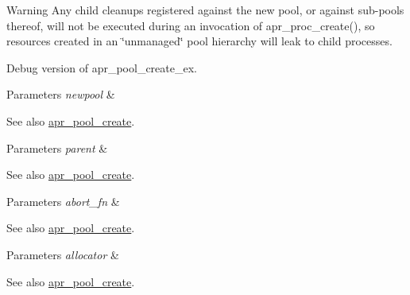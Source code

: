\begin{DoxyWarning}{Warning}
Any child cleanups registered against the new pool, or against sub-\/pools thereof, will not be executed during an invocation of apr\+\_\+proc\+\_\+create(), so resources created in an \char`\"{}unmanaged\char`\"{} pool hierarchy will leak to child processes.
\end{DoxyWarning}
Debug version of apr\+\_\+pool\+\_\+create\+\_\+ex. 
\begin{DoxyParams}{Parameters}
{\em newpool} & \\
\hline
\end{DoxyParams}
\begin{DoxySeeAlso}{See also}
\hyperlink{group__apr__pools_gaa7c40921aae156b665e82b0a66991a39}{apr\+\_\+pool\+\_\+create}. 
\end{DoxySeeAlso}

\begin{DoxyParams}{Parameters}
{\em parent} & \\
\hline
\end{DoxyParams}
\begin{DoxySeeAlso}{See also}
\hyperlink{group__apr__pools_gaa7c40921aae156b665e82b0a66991a39}{apr\+\_\+pool\+\_\+create}. 
\end{DoxySeeAlso}

\begin{DoxyParams}{Parameters}
{\em abort\+\_\+fn} & \\
\hline
\end{DoxyParams}
\begin{DoxySeeAlso}{See also}
\hyperlink{group__apr__pools_gaa7c40921aae156b665e82b0a66991a39}{apr\+\_\+pool\+\_\+create}. 
\end{DoxySeeAlso}

\begin{DoxyParams}{Parameters}
{\em allocator} & \\
\hline
\end{DoxyParams}
\begin{DoxySeeAlso}{See also}
\hyperlink{group__apr__pools_gaa7c40921aae156b665e82b0a66991a39}{apr\+\_\+pool\+\_\+create}. 
\end{DoxySeeAlso}

